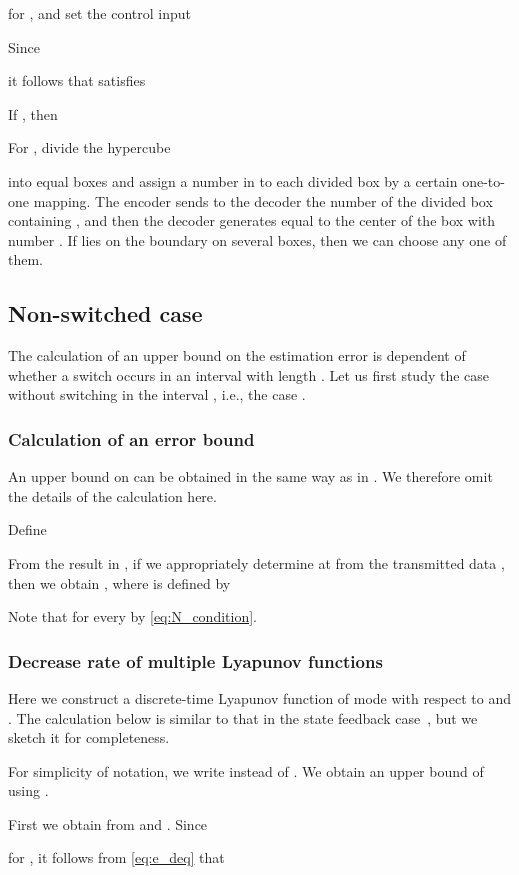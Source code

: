 \documentclass[letterpaper, 11pt, onecolumn]{ieeeconf}  \IEEEoverridecommandlockouts
\begin{document}
for , and set
the control input 

Since

it follows that  satisfies

If , then

For ,
divide the hypercube 

into  equal boxes and assign a number in 
to each divided box by a certain one-to-one mapping.
The encoder sends to the decoder 
the number  of the divided box containing 
, and then
the decoder generates  equal to the center of the box
with number .
If  lies on the boundary on several boxes, then
we can choose any one of them.


\subsection{Non-switched case}
The calculation of an upper bound  on the estimation error
is dependent of whether 
a switch occurs in an interval with length .
Let us first study the case without switching in the interval
, i.e., the case 
.

\subsubsection{Calculation of an error bound}
An upper bound  on  can be
obtained in the same way as in \cite{Liberzon2003}.
We therefore omit the details of the calculation here. 



Define

From the result in \cite{Liberzon2003}, 
if we appropriately determine  at 
from the transmitted data ,
then we obtain
, where
 is defined by

Note that  for every  
by \eqref{eq:N_condition}.

\subsubsection{Decrease rate of multiple Lyapunov functions}
Here we construct a discrete-time Lyapunov function  of mode  
with respect to  and .
The calculation below 
is similar to that in the state feedback case~\cite{Liberzon2014}, but
we sketch it for completeness.

For simplicity of notation, we write  instead of
.
We obtain an upper bound of  using .

First we obtain  from  and
.
Since

for ,
it follows from \eqref{eq:e_deq} that
\end{document}
